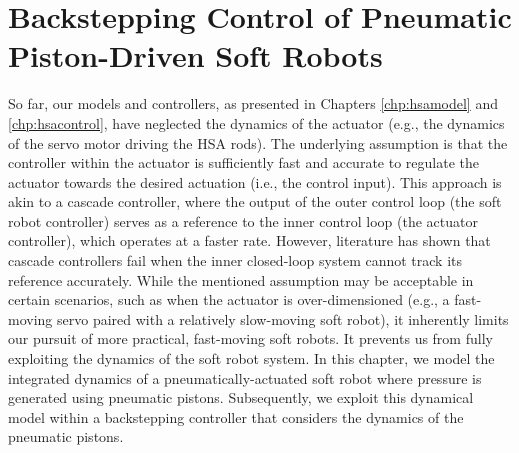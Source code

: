 \chapter{Backstepping Control of Pneumatic Piston-Driven Soft Robots}
\label{chp:backstepping}

\begin{foreword}
    So far, our models and controllers, as presented in Chapters \ref{chp:hsamodel} and \ref{chp:hsacontrol}, have neglected the dynamics of the actuator (e.g., the dynamics of the servo motor driving the \gls{HSA} rods). The underlying assumption is that the controller within the actuator is sufficiently fast and accurate to regulate the actuator towards the desired actuation (i.e., the control input). This approach is akin to a cascade controller, where the output of the outer control loop (the soft robot controller) serves as a reference to the inner control loop (the actuator controller), which operates at a faster rate.
    However, literature has shown that cascade controllers fail when the inner closed-loop system cannot track its reference accurately. While the mentioned assumption may be acceptable in certain scenarios, such as when the actuator is over-dimensioned (e.g., a fast-moving servo paired with a relatively slow-moving soft robot), it inherently limits our pursuit of more practical, fast-moving soft robots. It prevents us from fully exploiting the dynamics of the soft robot system.
    In this chapter, we model the integrated dynamics of a pneumatically-actuated soft robot where pressure is generated using pneumatic pistons. Subsequently, we exploit this dynamical model within a backstepping controller that considers the dynamics of the pneumatic pistons.
\end{foreword}


